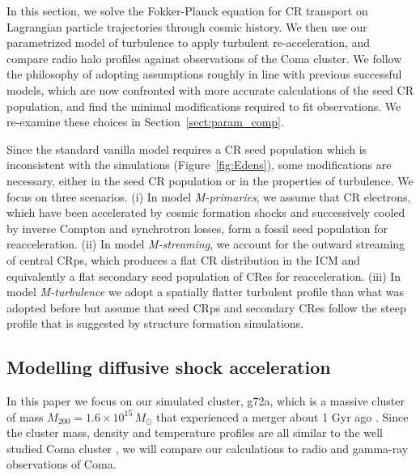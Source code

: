 \documentclass[fleqn,usenatbib,useAMS]{mnras}
\begin{document}
In this section, we solve the Fokker-Planck equation for CR transport on
Lagrangian particle trajectories through cosmic history. We then use our
parametrized model of turbulence to apply turbulent re-acceleration, and
compare radio halo profiles against observations of the Coma cluster. We follow
the philosophy of adopting assumptions roughly in line with previous successful
models, which are now confronted with more accurate calculations of the seed CR
population, and find the minimal modifications required to fit observations. We
re-examine these choices in Section~\ref{sect:param_comp}.

Since the standard vanilla model requires a CR seed population which is
inconsistent with the simulations (Figure~\ref{fig:Edens}), some modifications are
necessary, either in the seed CR population or in the properties of
turbulence. We focus on three scenarios. (i) In model {\em M-primaries}, we
assume that CR electrons, which have been accelerated by cosmic formation shocks
and successively cooled by inverse Compton and synchrotron losses, form a fossil
seed population for reacceleration. (ii) In model {\em M-streaming}, we account
for the outward streaming of central CRps, which produces a flat CR distribution
in the ICM and equivalently a flat secondary seed population of CRes for
reacceleration. (iii) In model {\em M-turbulence} we adopt a spatially flatter
turbulent profile than what was adopted before but assume that seed CRps and
secondary CRes follow the steep profile that is suggested by structure formation
simulations.

\subsection{Modelling diffusive shock acceleration}
\label{sec:cosmo_sim}
In this paper we focus on our simulated cluster, g72a, which is a
massive cluster of mass $M_{200}=1.6\times10^{15}\,M_\odot$ that
experienced a merger about 1 Gyr ago
\citep{2009MNRAS.399..497D}. Since the cluster mass, density and
temperature profiles are all similar to the well studied Coma cluster
\citep{2007MNRAS.378..385P,pinzke10}, we will compare our calculations
to radio and gamma-ray observations of Coma.
\end{document}
